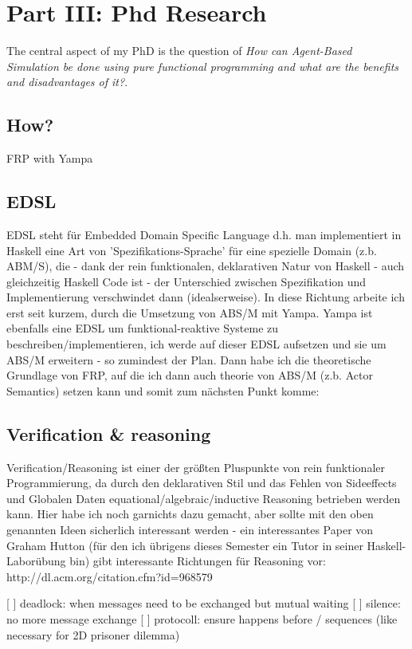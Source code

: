 \section{Part III: Phd Research} 
The central aspect of my PhD is the question of \textit{How can Agent-Based Simulation be done using pure functional programming and what are the benefits and disadvantages of it?}.


\subsection{How?}
FRP with Yampa

\subsection{EDSL}
EDSL steht für Embedded Domain Specific Language d.h. man implementiert in Haskell eine Art von 'Spezifikations-Sprache' für eine spezielle Domain (z.b. ABM/S), die - dank der rein funktionalen, deklarativen Natur von Haskell - auch gleichzeitig Haskell Code ist - der Unterschied zwischen Spezifikation und Implementierung verschwindet dann (idealserweise). In diese Richtung arbeite ich erst seit kurzem, durch die Umsetzung von ABS/M mit Yampa. Yampa ist ebenfalls eine EDSL um funktional-reaktive Systeme zu beschreiben/implementieren, ich werde auf dieser EDSL aufsetzen und sie um ABS/M erweitern - so zumindest der Plan. Dann habe ich die theoretische Grundlage von FRP, auf die ich dann auch theorie von ABS/M (z.b. Actor Semantics) setzen kann und somit zum nächsten Punkt komme:

\subsection{Verification \& reasoning}
Verification/Reasoning ist einer der größten Pluspunkte von rein funktionaler Programmierung, da durch den deklarativen Stil und das Fehlen von Sideeffects und Globalen Daten equational/algebraic/inductive Reasoning betrieben werden kann. Hier habe ich noch garnichts dazu gemacht, aber sollte mit den oben genannten Ideen sicherlich interessant werden - ein interessantes Paper von Graham Hutton (für den ich übrigens dieses Semester ein Tutor in seiner Haskell-Laborübung bin) gibt interessante Richtungen für Reasoning vor: http://dl.acm.org/citation.cfm?id=968579

[ ] deadlock: when messages need to be exchanged but mutual waiting
[ ] silence: no more message exchange
[ ] protocoll: ensure happens before / sequences (like necessary for 2D prisoner dilemma)

